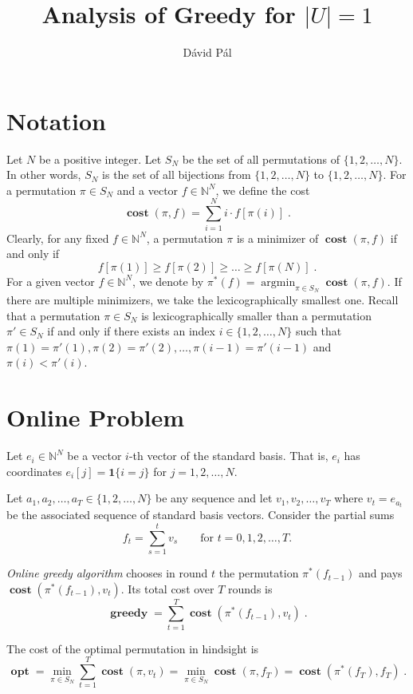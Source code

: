 \documentclass[12pt]{article}
\newcommand{\N}{\mathbb{N}}
\newcommand{\indicator}{\mathbf{1}}
\DeclareMathOperator*{\argmin}{argmin}
\DeclareMathOperator{\cost}{\mathbf{cost}}
\DeclareMathOperator{\greedy}{\mathbf{greedy}}
\DeclareMathOperator{\opt}{\mathbf{opt}}
\begin{document}
\title{Analysis of Greedy for $|U|=1$}
\author{D\'avid P\'al}
\maketitle

\section{Notation}

Let $N$ be a positive integer. Let $S_N$ be the set of all permutations of
$\{1,2,\dots,N\}$. In other words, $S_N$ is the set of all bijections from
$\{1,2,\dots,N\}$ to $\{1,2,\dots,N\}$. For a permutation $\pi \in S_N$ and a
vector $f \in \N^N$, we define the cost
$$
\cost(\pi,f) = \sum_{i=1}^N i \cdot f[\pi(i)] \; .
$$
Clearly, for any fixed $f \in \N^N$, a permutation $\pi$
is a minimizer of $\cost(\pi,f)$ if and only if
$$
f[\pi(1)] \ge f[\pi(2)] \ge \dots \ge f[\pi(N)] \; .
$$
For a given vector $f \in \N^N$, we denote by $\pi^*(f) = \argmin_{\pi \in S_N}
\cost(\pi, f)$. If there are multiple minimizers, we take the lexicographically
smallest one. Recall that a permutation $\pi \in S_N$ is lexicographically
smaller than a permutation $\pi' \in S_N$ if and only if there exists an index
$i \in \{1,2,\dots,N\}$ such that $\pi(1) = \pi'(1), \pi(2) = \pi'(2), \dots, \pi(i - 1) = \pi'(i -
1)$ and $\pi(i) < \pi'(i)$.


\section{Online Problem}

Let $e_i \in \N^N$ be a vector $i$-th vector of the standard basis.
That is, $e_i$ has coordinates $e_i[j] = \indicator\{i=j\}$
for $j=1,2,\dots,N$.

Let $a_1, a_2, \dots, a_T \in \{1,2,\dots,N\}$ be any sequence
and let $v_1, v_2, \dots, v_T$ where $v_t = e_{a_t}$ be the associated sequence
of standard basis vectors. Consider the partial sums
$$
f_t = \sum_{s=1}^t v_s \qquad \text{for $t=0,1,2,\dots,T$}.
$$

\emph{Online greedy algorithm} chooses in round $t$ the permutation $\pi^*(f_{t-1})$
and pays $\cost(\pi^*(f_{t-1}), v_t)$. Its total cost over $T$ rounds is
$$
\greedy = \sum_{t=1}^T \cost(\pi^*(f_{t-1}), v_t) \; .
$$

The cost of the optimal permutation in hindsight is
$$
\opt
= \min_{\pi \in S_N} \sum_{t=1}^T \cost(\pi, v_t)
= \min_{\pi \in S_N} \cost(\pi, f_T)
= \cost(\pi^*(f_T), f_T) \; .
$$
\end{document}
